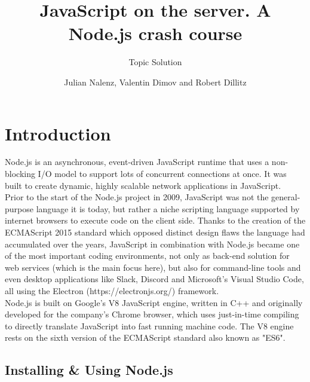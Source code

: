 \documentclass{bioinfo}
\begin{document}

\subtitle{Topic Solution}

\title[short Title]{JavaScript on the server. A Node.js crash course}
\author[Sample \textit{et~al}.]{Julian Nalenz, Valentin Dimov and Robert Dillitz}

\maketitle

\section{Introduction}

Node.js is an asynchronous, event-driven JavaScript runtime that uses a non-blocking I/O model to support lots of concurrent connections at once. It was built to create dynamic, highly scalable network applications in JavaScript.\\ Prior to the start of the Node.js project in 2009, JavaScript was not the general-purpose language it is today, but rather a niche scripting language supported by internet browsers to execute code on the client side. Thanks to the creation of the ECMAScript 2015 standard which opposed distinct design flaws the language had accumulated over the years, JavaScript in combination with Node.js became one of the most important coding environments, not only as back-end solution for web services (which is the main focus here), but also for command-line tools and even desktop applications like Slack, Discord and Microsoft's Visual Studio Code, all using the Electron (https://electronjs.org/) framework.\\
Node.js is built on Google's V8 JavaScript engine, written in C++ and originally developed for the company's Chrome browser, which uses just-in-time compiling to directly translate JavaScript into fast running machine code. The V8 engine rests on the sixth version of the ECMAScript standard also known as "ES6".

\subsection{Installing \& Using Node.js}
\end{document}
